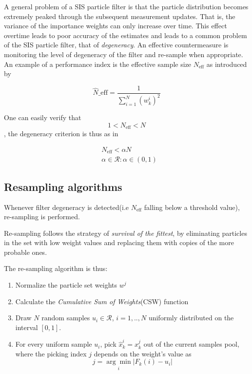 A general problem of a SIS particle filter is that the particle distribution becomes extremely peaked through the subsequent measurement updates. That is, the variance of the importance weights can only increase over time. This effect overtime leads to poor accuracy of the estimates and leads to a common problem of the SIS particle filter, that of \emph{degeneracy}. An effective countermeasure is monitoring the level of degeneracy of the filter and re-sample when appropriate. An example of a performance index is the effective sample size $N_{\text{eff}}$ as introduced by\cite{Kong1994}


\begin{equation}
\hat{N}\_{\text{eff}} = \frac{1}{\sum_{i=1}^{N}(w_k^i)^2}
\end{equation}


One can easily verify that $$1 < N_{\text{eff}} < N$$ , the degeneracy criterion is thus as in 

\begin{equation}\label{eq:criterion_degeneracy}
\begin{aligned}
&N_{\text{eff}} < \alpha N \\&\alpha \in \mathcal{R}: \alpha \in (0,1)
\end{aligned}
\end{equation}

\subsection{Resampling algorithms}


Whenever filter degeneracy is detected(i.e $N_{\text{eff}}$ falling below a threshold value), re-sampling is performed.


Re-sampling follows the strategy of \emph{survival of the fittest}, by eliminating particles in the set with low weight values and replacing them with copies of the more probable ones.


The re-sampling algorithm is thus\cite{Ristic2004}:

\begin{enumerate}
	\item Normalize the particle set weights $w^j$
	\item Calculate the \emph{Cumulative Sum of Weights}(CSW) function
	\item Draw $N$ random samples $u_i \in \mathcal{R}$, $i=1,..,N$ uniformly distributed on the interval $[0,1]$.
	\item For every uniform sample $u_i$, pick $\hat{x}_k^i = x_k^j$ out of the current samples pool, where the picking index $j$ depends on the weight's value as \[ j = \underset{i}{\arg\min} |{F_k(i)-u_i}| \]

\end{enumerate}

